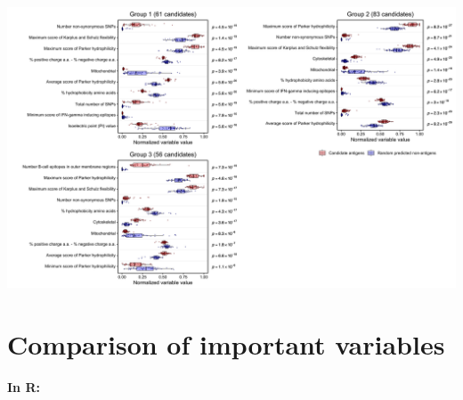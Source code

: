 \documentclass[
  11pt,
  oneside]{book}
\begin{document}
\begin{center}\includegraphics[width=1\linewidth]{./figures/Supplementary Fig 10} \end{center}

\hypertarget{comparison-of-important-variables}{%
\section{Comparison of important variables}\label{comparison-of-important-variables}}

\textbf{In R: }
\end{document}
